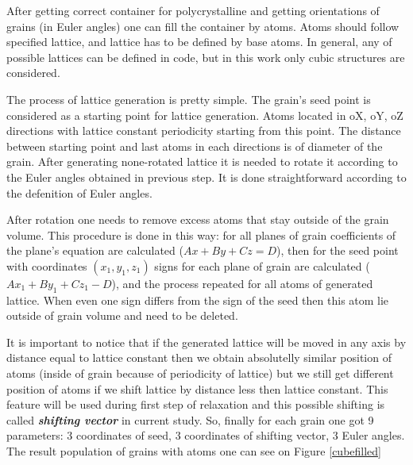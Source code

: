 \documentclass[12pt]{report}
\begin{document}
After getting correct container for polycrystalline and getting orientations of grains (in Euler angles) one can fill the container by atoms. Atoms should follow specified lattice, and lattice has to be defined by base atoms. In general, any of possible lattices can be defined in code, but in this work only cubic structures are considered.

The process of lattice generation is pretty simple. The grain's seed point is considered as a starting point for lattice generation. Atoms located in oX, oY, oZ directions with lattice constant periodicity starting from this point. The distance between starting point and last atoms in each directions is of diameter of the grain. After generating none-rotated lattice it is needed to rotate it according to the Euler angles obtained in previous step. It is done straightforward according to the defenition of Euler angles. 

After rotation one needs to remove excess atoms that stay outside of the grain volume. This procedure is done in this way: for all planes of grain coefficients of the plane's equation are calculated ($Ax + By + Cz = D$), then for the seed point with coordinates $(x_1, y_1, z_1)$ signs for each plane of grain are calculated ($Ax_1 + By_1 + Cz_1 - D$), and the process repeated for all atoms of generated lattice. When even one sign differs from the sign of the seed then this atom lie outside of grain volume and need to be deleted.

It is important to notice that if the generated lattice will be moved in any axis by distance equal to lattice constant then we obtain absolutelly similar position of atoms (inside of grain because of periodicity of lattice) but we still get different position of atoms if we shift lattice by distance less then lattice constant. This feature will be used during first step of relaxation and this possible shifting is called \textit{\textbf{shifting vector}} in current study. So, finally for each grain one got 9 parameters: 3 coordinates of seed, 3 coordinates of shifting vector, 3 Euler angles. The result population of grains with atoms one can see on Figure \ref{cubefilled}
\end{document}
